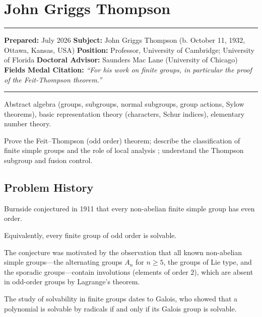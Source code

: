 \chapter{John Griggs Thompson}\label{ch1970johngriggsthompson:john-griggs-thompson-fields-medal-1970-a-comprehensive-report-on-his-work-and-impact}

\begin{center}\rule{0.5\linewidth}{0.5pt}\end{center}

\textbf{Prepared:} July 2026
\textbf{Subject:} John Griggs Thompson (b. October 11, 1932, Ottawa, Kansas, USA)
\textbf{Position:} Professor, University of Cambridge; University of Florida
\textbf{Doctoral Advisor:} Saunders Mac Lane (University of Chicago)
\textbf{Fields Medal Citation:} \emph{``For his work on finite groups, in particular the proof of the Feit-Thompson theorem.''}

\begin{center}\rule{0.5\linewidth}{0.5pt}\end{center}

\begin{prereqs}
Abstract algebra (groups, subgroups, normal subgroups, group actions, Sylow theorems), basic representation theory (characters, Schur indices), elementary number theory.
\end{prereqs}

\begin{objectives}
Prove the Feit--Thompson (odd order) theorem; describe the classification of finite simple groups and the role of local analysis \cite{thompson1968}; understand the Thompson subgroup and fusion control.
\end{objectives}

\section{Problem History}

Burnside conjectured in 1911 that every non-abelian finite simple group has even order.

Equivalently, every finite group of odd order is solvable.

The conjecture was motivated by the observation that all known non-abelian simple groups---the alternating groups $A_n$ for $n \geq 5$, the groups of Lie type, and the sporadic groups---contain involutions (elements of order 2), which are absent in odd-order groups by Lagrange's theorem.

The study of solvability in finite groups dates to Galois, who showed that a polynomial is solvable by radicals if and only if its Galois group is solvable.

